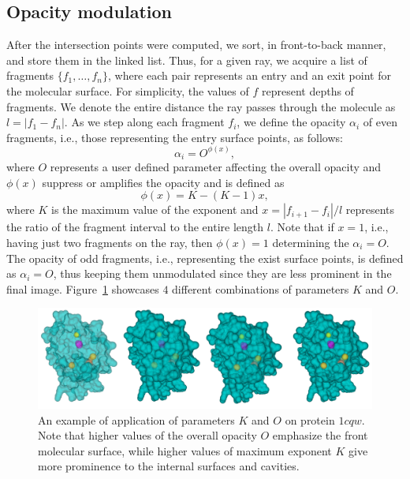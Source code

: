\subsection{Opacity modulation}
After the intersection points were computed, we sort, in front-to-back manner, and store them in the linked list. Thus, for a given ray, we acquire a list of fragments $\{f_1,\ldots,f_n \}$, where each pair represents an entry and an exit point for the molecular surface. For simplicity, the values of $f$ represent depths of fragments. We denote the entire distance the ray passes through the molecule as $l=|f_1-f_n|$. 
As we step along each fragment $f_i$, we define the opacity $\alpha_i$ of even fragments, i.e., those representing the entry surface points, as follows:
\begin{equation}
  \alpha_i = O^{\phi(x)},
	\label{eq:alphaDistEven}
\end{equation}	
where $O$ represents a user defined parameter affecting the overall opacity and $\phi(x)$ suppress or amplifies the opacity and is defined as
\begin{equation}
  \phi(x) = K-(K-1)x,
	\label{eq:exponent}
\end{equation}	
where $K$ is the maximum value of the exponent and $x=|f_{i+1}-f_i|/l$ represents the ratio of the fragment interval to the entire length $l$. Note that if $x=1$, i.e., having just two fragments on the ray, then $\phi(x)=1$ determining the $\alpha_i=O$. The opacity of odd fragments, i.e., representing the exist surface points, is defined as $\alpha_i = O$, thus keeping them unmodulated since they are less prominent in the final image.
Figure~\ref{fig:Oparam} showcases $4$ different combinations of parameters $K$ and $O$.
\begin{figure}[htb]
  \centering
  \includegraphics[width=\textwidth]{image/Oparam.png}
  \caption{An example of application of parameters $K$ and $O$ on protein $1cqw$. Note that higher values of the overall opacity $O$ emphasize the front molecular surface, while higher values of maximum exponent $K$ give more prominence to the internal surfaces and cavities.}
	\label{fig:Oparam}
\end{figure}
